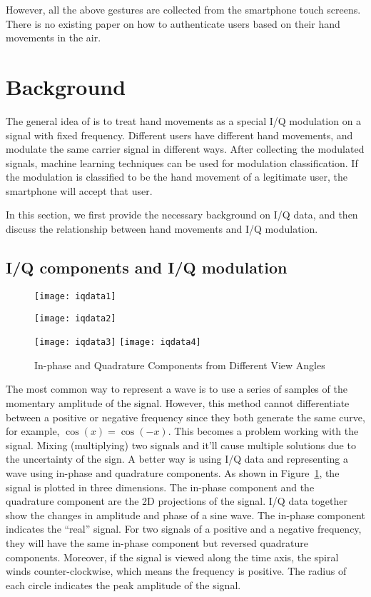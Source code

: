 However, all the above gestures are collected from the smartphone touch screens. There is no existing paper on how to authenticate users based on their hand movements in the air.

\section{Background}\label{sec:handIQ}
The general idea of {\uu} is to treat hand movements as a special I/Q modulation on a signal with fixed frequency. Different users have different hand movements, and modulate the same carrier signal in different ways. After collecting the modulated signals, machine learning techniques can be used for modulation classification. If the modulation is classified to be the hand movement of a legitimate user, the smartphone will accept that user. 

In this section, we first provide the necessary background on I/Q data, and then discuss the relationship between hand movements and I/Q modulation.

\subsection{I/Q components and I/Q modulation}
\begin{figure}[!h]
	\centering
	\texttt{[image: iqdata1]}
	\begin{minipage}{.4\linewidth}
		\texttt{[image: iqdata2]}
	\end{minipage}
	\hfil
	\begin{minipage}{.5\linewidth}
		\texttt{[image: iqdata3]}
		\texttt{[image: iqdata4]}
	\end{minipage}
	\caption{In-phase and Quadrature Components from Different View Angles}
	\label{fig:iqdata}
\end{figure}

The most common way to represent a wave is to use a series of samples of the momentary amplitude of the signal. However, this method cannot differentiate between a positive or negative frequency since they both generate the same curve, for example, $\cos(x) = \cos(-x)$. This becomes a problem working with the signal. Mixing (multiplying) two signals and it'll cause multiple solutions due to the uncertainty of the sign. A better way is using I/Q data and representing a wave using in-phase and quadrature components. As shown in Figure~\ref{fig:iqdata}, the signal is plotted in three dimensions. The in-phase component and the quadrature component are the 2D projections of the signal. I/Q data together show the changes in amplitude and phase of a sine wave. The in-phase component indicates the ``real'' signal. For two signals of a positive and a negative frequency, they will have the same in-phase component but reversed quadrature components. Moreover, if the signal is viewed along the time axis, the spiral winds counter-clockwise, which means the frequency is positive. The radius of each circle indicates the peak amplitude of the signal.

